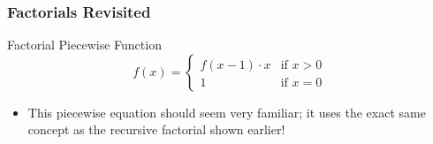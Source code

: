 \message{ !name(recursion.tex)}\documentclass[fleqn, t]{beamer}
\begin{document}
\begin{frame}
  \frametitle{Factorials Revisited}
  \begin{block}{Factorial Piecewise Function}
    \begin{equation*}
      f(x) = 
      \begin{cases}
        f(x - 1) \cdot x & \text{if } x > 0\\
        1 & \text{if } x = 0
      \end{cases}
    \end{equation*}
  \end{block}
  \begin{itemize}[<+->]
  \item This piecewise equation should seem very familiar; it uses the exact
    same concept as the recursive factorial shown earlier!
  \end{itemize}
  \begin{figure}
  \end{figure}
\end{frame}
\end{document}
